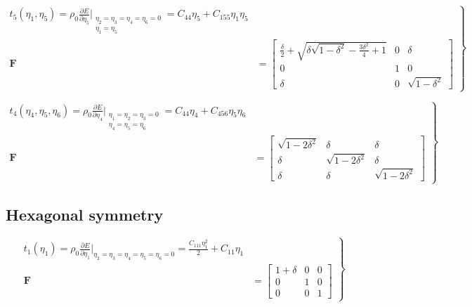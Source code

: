 \documentclass[showpacs,aps,floatfix,prb,reprint,superscriptaddress,onecolumn]{revtex4-1}
\begin{document}
\begin{enumerate}
\begin{equation}
\label{eqn:SM-hexs6}
  \left.\begin{aligned}
        t_{5} \left(\eta_{1}, \eta_{5}\right) = \rho_{0} \frac{\partial E}{\partial \eta_{5}}\Bigr|_{\substack{\eta_2=\eta_3=\eta_4=\eta_6=0 \\ \eta_{1} = \eta_{5}}} = C_{44}\eta_{5} + C_{155}\eta_{1}\eta_{5} \\
        \bm{F}&=\begin{bmatrix} \frac{\delta}{2}+\sqrt{\delta \sqrt{1-\delta^2}-\frac{3 \delta^2}{4}+1} & 0 & \delta \\ 0 & 1 & 0 \\ \delta & 0 & \sqrt{1-\delta^2} \end{bmatrix}
       \end{aligned}
			\right\}
\end{equation}


\begin{equation}
\label{eqn:SM-hexs7}
  \left.\begin{aligned}
        t_{4} \left(\eta_{4}, \eta_{5}, \eta_{6} \right) = \rho_{0} \frac{\partial E}{\partial \eta_{4}}\Bigr|_{\substack{\eta_1=\eta_2=\eta_3=0 \\ \eta_{4}=\eta_{5}=\eta_{6}}} = C_{44} \eta_{4} + C_{456}\eta_{5}\eta_{6} \\
        \bm{F}&=\begin{bmatrix} \sqrt{1-2\delta^{2}} & \delta & \delta \\ \delta & \sqrt{1-2\delta^{2}} & \delta \\ \delta & \delta & \sqrt{1-2\delta^{2}} \end{bmatrix}
       \end{aligned}
			\right\}
\end{equation}





\subsection{Hexagonal symmetry}


\begin{equation}
\label{eqn:SM-s1}
  \left.\begin{aligned}
        t_{1} \left(\eta_{1}\right) = \rho_{0} \frac{\partial E}{\partial \eta_{1}}\Bigr|_{\eta_2=\eta_3=\eta_4=\eta_5=\eta_6=0} = \frac{C_{111}\eta_{1}^2}{2} + C_{11}\eta_{1}\\
        \bm{F}&=\begin{bmatrix} 1+\delta & 0 & 0 \\ 0 & 1 & 0 \\ 0 & 0 & 1 \end{bmatrix}
       \end{aligned}
			\right\}
\end{equation}


\end{enumerate}
\end{document}
